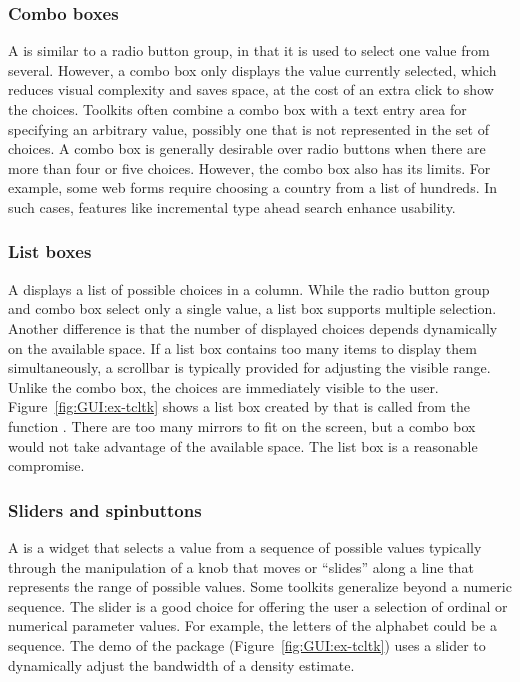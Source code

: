 \subsubsection{Combo boxes}
\label{sec:GUI:combo-boxes}

A  is similar to a radio button group, in that it is
used to select one value from several. However, a combo box only
displays the value currently selected, which reduces visual complexity
and saves space, at the cost of an extra click to show the
choices. Toolkits often combine a combo box with a text entry area for
specifying an arbitrary value, possibly one that is not represented in
the set of choices. A combo box is generally desirable over radio
buttons when there are more than four or five choices. However, the
combo box also has its limits. For example, some web forms require
choosing a country from a list of hundreds. In such cases, features
like incremental type ahead search enhance usability.

\subsubsection{List boxes}

A  displays a list of possible choices in a column.
While the radio button group and combo box select only a single value,
a list box supports multiple selection. Another difference is that the
number of displayed choices depends dynamically on the available
space. If a list box contains too many items to display them
simultaneously, a scrollbar is typically provided for adjusting the
visible range. Unlike the combo box, the choices are immediately visible
to the user.  Figure~\ref{fig:GUI:ex-tcltk} shows a list
box created by \R\/ that is called from the function
. There are too many mirrors to fit on the
screen, but a combo box would not take advantage of the available
space. The list box is a reasonable compromise.

\subsubsection{Sliders and spinbuttons}
\label{sec:GUI:sliders}

A  is a widget that selects a value from a sequence of
possible values typically through the manipulation of a knob that
moves or ``slides'' along a line that represents the range of possible
values. 
Some toolkits generalize beyond a numeric
sequence. The slider is a good choice for offering the user a
selection of ordinal or numerical parameter values. For example, the
letters of the alphabet could be a sequence. The  demo
of the  package (Figure~\ref{fig:GUI:ex-tcltk}) uses a
slider to dynamically adjust the bandwidth of a density estimate.

